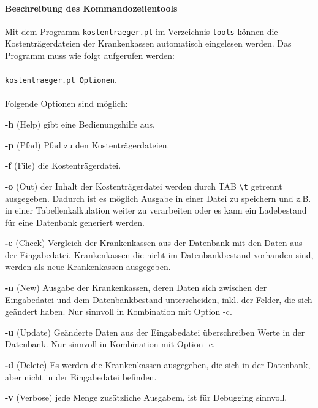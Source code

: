 \paragraph{Beschreibung des Kommandozeilentools}
Mit dem Programm \verb|kostentraeger.pl| im Verzeichnis \verb|tools| können
die Kostenträgerdateien der Krankenkassen
automatisch eingelesen werden. Das Programm muss wie folgt aufgerufen werden:\\
\\
\verb|kostentraeger.pl Optionen|. \\
\\
Folgende Optionen sind möglich:
\begin{compactdesc}
\item\textbf{-h} (Help) gibt eine Bedienungshilfe aus.
\item\textbf{-p} (Pfad) Pfad zu den Kostenträgerdateien.
\item\textbf{-f} (File) die Kostenträgerdatei.
\item\textbf{-o} (Out) der Inhalt der Kostenträgerdatei werden durch TAB \verb|\t| getrennt
ausgegeben. Dadurch ist es möglich Ausgabe in einer Datei zu speichern und
z.B. in einer Tabellenkalkulation weiter zu verarbeiten oder es kann
ein Ladebestand für eine Datenbank generiert werden.
\item\textbf{-c} (Check) Vergleich der Krankenkassen aus der Datenbank mit den Daten aus
der Eingabedatei. Krankenkassen die nicht im Datenbankbestand vorhanden sind,
werden als neue Krankenkassen ausgegeben.
\item\textbf{-n} (New) Ausgabe der Krankenkassen, deren Daten sich zwischen der Eingabedatei
und dem Datenbankbestand unterscheiden, inkl. der Felder, die sich geändert
haben. Nur sinnvoll in Kombination mit Option -c.
\item\textbf{-u} (Update) Geänderte Daten aus der Eingabedatei überschreiben Werte in
der Datenbank. Nur sinnvoll in Kombination mit Option -c.
\item\textbf{-d} (Delete) Es werden die Krankenkassen ausgegeben, die sich in der
Datenbank, aber nicht in der Eingabedatei befinden.
\item\textbf{-v} (Verbose) jede Menge zusätzliche Ausgabem, ist für Debugging sinnvoll.
\end{compactdesc}

